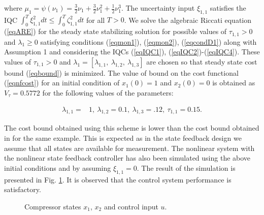\documentclass[twocolumn]{autart}
\begin{document}
\noindent where $\mu_1=\psi(\nu_1)=\frac{3}{2}\nu_1+\frac{3}{2}\nu_1^2+\frac{1}{2}\nu_1^3$. The uncertainty input $\xi_{1,1}$ satisfies the IQC 
$\int_0^T \xi_{1,1}^2 dt \leq \int_0^T \zeta_{1,1}^2 dt$ for all $T>0$. We solve the algebraic Riccati equation (\ref{eqARE}) for the steady state stabilizing solution for possible values of $\tau_{1,1}>0$ and $\lambda_1\geq0$ satisfying conditions (\ref{eqmon1}), (\ref{eqmon2}), (\ref{eqcondD1}) along with Assumption 1 and considering the IQCs (\ref{eqIQC1}), (\ref{eqIQC2})-(\ref{eqIQC4}). These values of $\tau_{1,1}>0$ and $\lambda_1=[\lambda_{1,1},~\lambda_{1,2},~\lambda_{1,3}]$ are chosen so that steady state cost bound (\ref{eqbound}) is minimized.   The value of bound on the cost functional (\ref{eqnfcost}) for an initial condition of $x_1(0)=1$ and $x_2(0)=0$ is obtained as $V_\tau= 0.5772$ for the following values of the parameters:
\begin{small}
\[
\begin{split}
\lambda_{1,1}=&1 , ~\lambda_{1,2}=0.1,~\lambda_{1,3}=.12,~ \tau_{1,1}=0.15.
\end{split}
\]
\end{small}
The cost bound obtained using this scheme is lower than the cost bound obtained in \cite{outputfeedback_petersen} for the same example. This is expected as in the state feedback design we assume that all states are available for measurement. The nonlinear system with the nonlinear state feedback controller has also been simulated using  the above initial conditions and by assuming $\xi_{1,1}=0$. The result of the simulation is presented in Fig. \ref{fig:simulation}. It is observed that the control system performance is satisfactory.
\begin{figure}[t]
\hfill
\begin{center}
\caption{Compressor states $x_1$, $x_2$ and control input $u$.}
\label{fig:simulation}
\end{center}
\end{figure}
\vspace{1mm}

\end{document}
